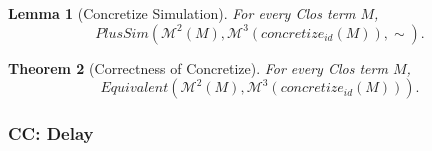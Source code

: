 \documentclass[10pt]{article}
\theoremstyle{acmplain}
\newtheorem{theorem}{Theorem}[section]
\newtheorem{lemma}[theorem]{Lemma}
\newcommand{\pass}[1]{\mathit{#1}}
\newcommand{\Mach}[1]{\mathcal{M}^{#1}}
\newcommand{\Equiv}{\mathit{Equivalent}}
\begin{document}
\begin{lemma}[Concretize Simulation]\label{lem:concretize-fsim}
For every Clos term $M$,
\[
  \mathit{PlusSim}(\Mach{2}(M), \Mach{3}(\pass{concretize}_{\mathit{id}}(M)), \sim) .
\]
\end{lemma}

\begin{theorem}[Correctness of Concretize]\label{thm:concretize-correct}
For every Clos term $M$,
\[
  \Equiv(\Mach{2}(M), \Mach{3}(\pass{concretize}_{\mathit{id}}(M))) .
\]
\end{theorem}

\subsubsection{CC: Delay}\label{sec:sim-delay}
\end{document}
